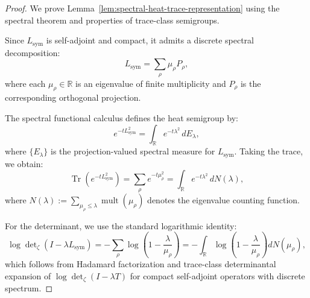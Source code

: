 \begin{proof}
We prove Lemma~\ref{lem:spectral-heat-trace-representation} using the spectral theorem and properties of trace-class semigroups.

Since \( L_{\mathrm{sym}} \) is self-adjoint and compact, it admits a discrete spectral decomposition:
\[
L_{\mathrm{sym}} = \sum_{\rho} \mu_\rho P_\rho,
\]
where each \( \mu_\rho \in \mathbb{R} \) is an eigenvalue of finite multiplicity and \( P_\rho \) is the corresponding orthogonal projection.

The spectral functional calculus defines the heat semigroup by:
\[
e^{-tL_{\mathrm{sym}}^2} = \int_{\mathbb{R}} e^{-t\lambda^2} \, dE_\lambda,
\]
where \( \{E_\lambda\} \) is the projection-valued spectral measure for \( L_{\mathrm{sym}} \). Taking the trace, we obtain:
\[
\operatorname{Tr}(e^{-tL_{\mathrm{sym}}^2}) = \sum_\rho e^{-t\mu_\rho^2} = \int_{\mathbb{R}} e^{-t\lambda^2} \, dN(\lambda),
\]
where \( N(\lambda) := \sum_{\mu_\rho \leq \lambda} \operatorname{mult}(\mu_\rho) \) denotes the eigenvalue counting function.

For the determinant, we use the standard logarithmic identity:
\[
\log \det\nolimits_{\zeta}(I - \lambda L_{\mathrm{sym}}) = - \sum_\rho \log\left(1 - \frac{\lambda}{\mu_\rho} \right) = - \int_{\mathbb{R}} \log\left(1 - \frac{\lambda}{\mu_\rho} \right) dN(\mu_\rho),
\]
which follows from Hadamard factorization and trace-class determinantal expansion of \( \log \det\nolimits_{\zeta}(I - \lambda T) \) for compact self-adjoint operators with discrete spectrum.
\end{proof}
%  